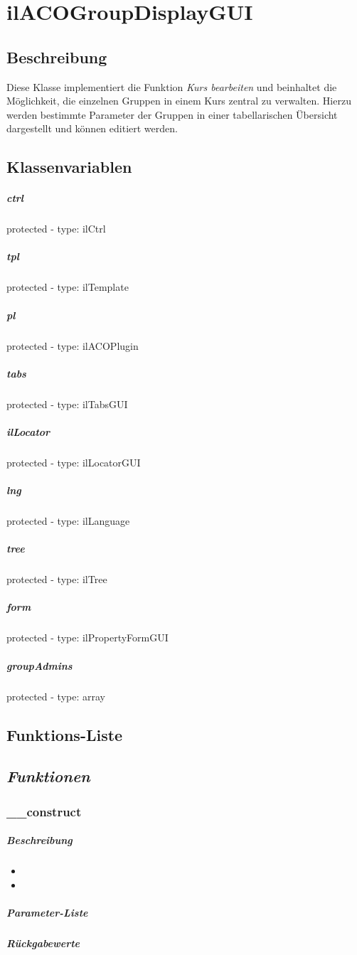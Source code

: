 \section{ilACOGroupDisplayGUI}

\subsection*{Beschreibung}
Diese Klasse implementiert die Funktion \textit{Kurs bearbeiten} und beinhaltet die Möglichkeit, die einzelnen Gruppen in einem Kurs zentral zu verwalten. 
Hierzu werden bestimmte Parameter der Gruppen in einer tabellarischen Übersicht dargestellt und können editiert werden.

\subsection*{Klassenvariablen}
\subparagraph{ctrl}
protected - type: ilCtrl
\subparagraph{tpl}
protected - type: ilTemplate
\subparagraph{pl}
protected - type: ilACOPlugin
\subparagraph{tabs}
protected - type: ilTabsGUI
\subparagraph{ilLocator}
protected - type: ilLocatorGUI
\subparagraph{lng}
protected - type: ilLanguage
\subparagraph{tree}
protected - type: ilTree
\subparagraph{form}
protected - type: ilPropertyFormGUI
\subparagraph{groupAdmins}
protected - type: array

\subsection*{Funktions-Liste}
\subparagraph{}
\subparagraph{}
\subparagraph{}
\subparagraph{}
\subparagraph{}
\subparagraph{}
\subparagraph{}
\subparagraph{}
\subparagraph{}
\subparagraph{}
\subparagraph{}
\subparagraph{}
\subparagraph{}
\subparagraph{}
\subparagraph{}
\subparagraph{}

\subsection*{\textit{Funktionen}}

\subsubsection*{\_\_construct}\label{constructGDGUI}
\subparagraph{Beschreibung}
\begin{itemize}
	\item[] \noindent{}
	\item[] 
\end{itemize}
\subparagraph{Parameter-Liste}
\subparagraph{Rückgabewerte}

